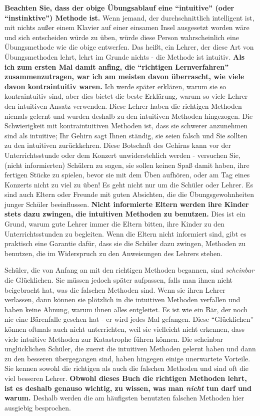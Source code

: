 \textbf{Beachten Sie, dass der obige Übungsablauf eine \enquote{intuitive} (oder \enquote{instinktive}) Methode ist.}
Wenn jemand, der durchschnittlich intelligent ist, mit nichts außer einem Klavier auf einer einsamen Insel ausgesetzt worden wäre und sich entscheiden würde zu üben, würde diese Person wahrscheinlich eine Übungsmethode wie die obige entwerfen.
Das heißt, ein Lehrer, der diese Art von Übungsmethoden lehrt, lehrt im Grunde nichts - die Methode ist intuitiv.
\textbf{Als ich zum ersten Mal damit anfing, die \enquote{richtigen Lernverfahren} zusammenzutragen, war ich am meisten davon überrascht, wie viele davon kontraintuitiv waren.}
Ich werde später erklären, warum sie so kontraintuitiv sind, aber dies bietet die beste Erklärung, warum so viele Lehrer den intuitiven Ansatz verwenden.
Diese Lehrer haben die richtigen Methoden niemals gelernt und wurden deshalb zu den intuitiven Methoden hingezogen.
Die Schwierigkeit mit kontraintuitiven Methoden ist, dass sie schwerer anzunehmen sind als intuitive; Ihr Gehirn sagt Ihnen ständig, sie seien falsch und Sie sollten zu den intuitiven zurückkehren.
Diese Botschaft des Gehirns kann vor der Unterrichtsstunde oder dem Konzert unwiderstehlich werden - versuchen Sie, (nicht informierten) Schülern zu sagen, sie sollen keinen Spaß damit haben, ihre fertigen Stücke zu spielen, bevor sie mit dem Üben aufhören, oder am Tag eines Konzerts nicht zu viel zu üben!
Es geht nicht nur um die Schüler oder Lehrer.
Es sind auch Eltern oder Freunde mit guten Absichten, die die Übungsgewohnheiten junger Schüler beeinflussen.
\textbf{Nicht informierte Eltern werden ihre Kinder stets dazu zwingen, die intuitiven Methoden zu benutzen.}
Dies ist ein Grund, warum gute Lehrer immer die Eltern bitten, ihre Kinder zu den Unterrichtsstunden zu begleiten.
Wenn die Eltern nicht informiert sind, gibt es praktisch eine Garantie dafür, dass sie die Schüler dazu zwingen, Methoden zu benutzen, die im Widerspruch zu den Anweisungen des Lehrers stehen.

Schüler, die von Anfang an mit den richtigen Methoden begannen, sind \textit{scheinbar} die Glücklichen.
Sie müssen jedoch später aufpassen, falls man ihnen nicht beigebracht hat, was die falschen Methoden sind.
Wenn sie ihren Lehrer verlassen, dann können sie plötzlich in die intuitiven Methoden verfallen und haben keine Ahnung, warum ihnen alles entgleitet.
Es ist wie ein Bär, der noch nie eine Bärenfalle gesehen hat - er wird jedes Mal gefangen.
Diese \enquote{Glücklichen} können oftmals auch nicht unterrichten, weil sie vielleicht nicht erkennen, dass viele intuitive Methoden zur Katastrophe führen können.
Die scheinbar unglücklichen Schüler, die zuerst die intuitiven Methoden gelernt haben und dann zu den besseren übergegangen sind, haben hingegen einige unerwartete Vorteile.
Sie kennen sowohl die richtigen als auch die falschen Methoden und sind oft die viel besseren Lehrer.
\textbf{Obwohl dieses Buch die richtigen Methoden lehrt, ist es deshalb genauso wichtig, zu wissen, was man \textit{nicht} tun darf und warum.}
Deshalb werden die am häufigsten benutzten falschen Methoden hier ausgiebig besprochen.

